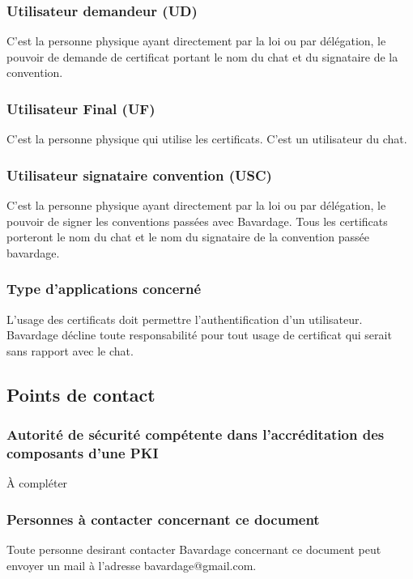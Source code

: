 \documentclass[a4paper,11pt,french]{book}
\begin{document}
\subsubsection{ Utilisateur demandeur (UD)}

C'est la personne physique ayant directement par la loi ou par délégation, le pouvoir de demande de certificat portant le nom du chat et du signataire de la convention.

\subsubsection{ Utilisateur Final (UF)}

C'est la personne physique qui utilise les certificats. C'est un utilisateur du chat.

\subsubsection{Utilisateur signataire convention (USC)}

C'est la personne physique ayant directement par la loi ou par délégation, le pouvoir de signer les conventions passées avec Bavardage. Tous les certificats porteront le nom du chat et le nom du signataire de la convention passée bavardage. 
		
\subsubsection{Type d'applications concerné}

L'usage des certificats doit permettre l'authentification d'un utilisateur. Bavardage décline toute responsabilité pour tout usage de certificat qui serait sans rapport avec le chat.

\subsection{Points de contact}
\subsubsection{Autorité de sécurité compétente dans l'accréditation des composants d'une PKI}
		À compléter
		
\subsubsection{Personnes à contacter concernant ce document}		
Toute personne desirant contacter Bavardage concernant ce document peut envoyer un mail à l'adresse bavardage@gmail.com.
\end{document}
